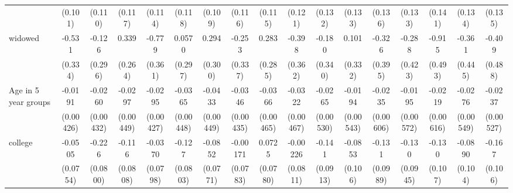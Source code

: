 {\begin{tabular}{l*{16}{c}}
                    &     (0.101)         &     (0.110)         &     (0.117)         &     (0.114)         &     (0.118)         &     (0.109)         &     (0.116)         &     (0.115)         &     (0.121)         &     (0.132)         &     (0.133)         &     (0.136)         &     (0.133)         &     (0.141)         &     (0.134)         &     (0.135)         \\
[1em]
widowed             &      -0.531         &      -0.126         &       0.339         &      -0.779\sym{*}  &      0.0570         &       0.294         &      -0.253         &       0.283         &      -0.398         &      -0.180         &       0.101         &      -0.326         &      -0.288         &      -0.915         &      -0.361         &      -0.409         \\
                    &     (0.334)         &     (0.296)         &     (0.264)         &     (0.361)         &     (0.297)         &     (0.300)         &     (0.337)         &     (0.285)         &     (0.362)         &     (0.340)         &     (0.332)         &     (0.395)         &     (0.423)         &     (0.493)         &     (0.445)         &     (0.488)         \\
[1em]
Age in 5 year groups&     -0.0191\sym{***}&     -0.0260\sym{***}&     -0.0297\sym{***}&     -0.0295\sym{***}&     -0.0365\sym{***}&     -0.0433\sym{***}&     -0.0346\sym{***}&     -0.0366\sym{***}&     -0.0322\sym{***}&     -0.0265\sym{***}&     -0.0194\sym{***}&     -0.0235\sym{***}&     -0.0195\sym{***}&     -0.0219\sym{***}&     -0.0276\sym{***}&     -0.0237\sym{***}\\
                    &   (0.00426)         &   (0.00432)         &   (0.00449)         &   (0.00427)         &   (0.00448)         &   (0.00449)         &   (0.00435)         &   (0.00465)         &   (0.00467)         &   (0.00530)         &   (0.00543)         &   (0.00606)         &   (0.00572)         &   (0.00616)         &   (0.00549)         &   (0.00527)         \\
[1em]
college             &     -0.0505         &      -0.226\sym{**} &      -0.116         &     -0.0370         &      -0.127         &     -0.0852         &    -0.00171         &      0.0725         &    -0.00226         &      -0.141         &     -0.0853         &      -0.131         &      -0.130         &      -0.130         &     -0.0890         &      -0.167         \\
                    &    (0.0754)         &    (0.0800)         &    (0.0808)         &    (0.0798)         &    (0.0803)         &    (0.0771)         &    (0.0783)         &    (0.0780)         &    (0.0811)         &    (0.0913)         &     (0.106)         &    (0.0989)         &    (0.0945)         &     (0.107)         &     (0.104)         &     (0.106)         \\

\end{tabular}}
